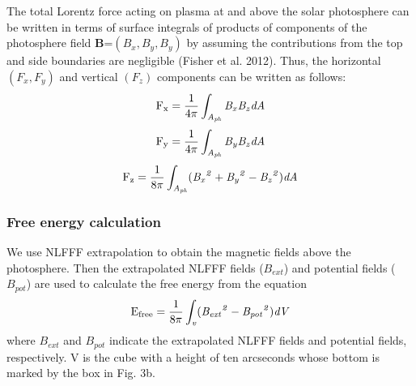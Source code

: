 \documentclass[12pt,preprint]{aastex}
\begin{document}
\begin{CJK*}{UTF8}{gbsn}
The total Lorentz force acting on plasma at and above the solar photosphere can be written in terms of surface integrals of products of components of the photosphere field {\bf B}=$(B_{x}, B_{y}, B_{y})$ by assuming the contributions from the top and side boundaries are negligible (Fisher et al. 2012). Thus, the horizontal $(F_{x}, F_{y})$ and vertical $(F_{z})$ components can be written as follows: 
\begin{equation}\label{equation5}
\rm{F_{x}}={1\over{4\pi}}\it\int_{A_{ph}} B_{x}B_{z}dA  
\end{equation}
 \begin{equation}\label{equation6}
 \rm{F_{y}}={1\over{4\pi}}\it\int_{A_{ph}} B_{y}B_{z}dA
 \end{equation}
 \begin{equation}\label{equation7}
 \rm{F_{z}}={1\over{8\pi}}\it\int_{A_{ph}} ({B_{x}}^{2}+{B_{y}}^{2}-{B_{z}}^{2})dA
 \end{equation}

\subsubsection{Free energy calculation} 
We use NLFFF extrapolation to obtain the magnetic fields above the photosphere. Then the extrapolated NLFFF fields ($B_{ext}$) and potential fields ($B_{pot}$) are used to calculate the free energy from the equation
\begin{equation}\label{equation8}
\rm{E_{free}}={1\over{8\pi}}\it\int_{v} ({B_{ext}}^{2}-{B_{pot}}^{2})dV  
\end{equation}
where $B_{ext}$ and $B_{pot}$ indicate the extrapolated NLFFF fields and potential fields, respectively. V is the cube with a height of ten arcseconds whose bottom is marked by the box in Fig. 3b. 


\end{CJK*}
\end{document}
